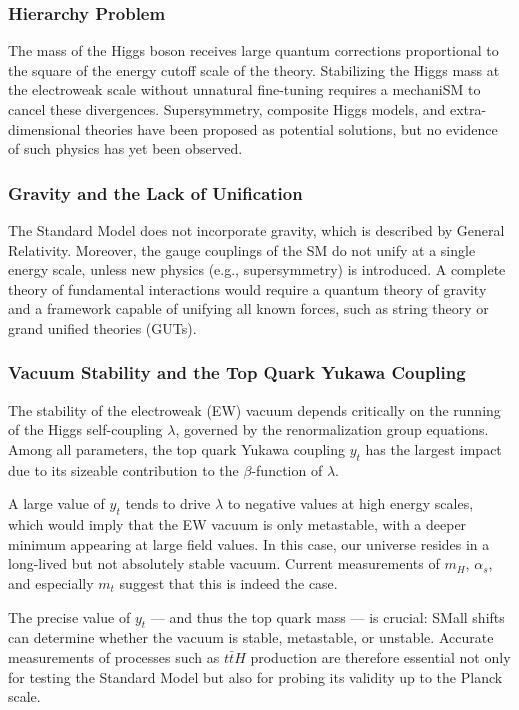 \documentclass[11pt,twoside]{book}
\begin{document}
\subsubsection*{Hierarchy Problem}

The mass of the Higgs boson receives large quantum corrections proportional to the square of the energy cutoff scale of the theory. Stabilizing the Higgs mass at the electroweak scale without unnatural fine-tuning requires a mechani\acrshort{SM} to cancel these divergences. Supersymmetry, composite Higgs models, and extra-dimensional theories have been proposed as potential solutions, but no evidence of such physics has yet been observed.

\subsubsection*{Gravity and the Lack of Unification}

The Standard Model does not incorporate gravity, which is described by General Relativity. Moreover, the gauge couplings of the \acrshort{SM} do not unify at a single energy scale, unless new physics (e.g., supersymmetry) is introduced. A complete theory of fundamental interactions would require a quantum theory of gravity and a framework capable of unifying all known forces, such as string theory or grand unified theories (GUTs).

\subsubsection*{Vacuum Stability and the Top Quark Yukawa Coupling}
The stability of the electroweak (EW) vacuum depends critically on the running of the Higgs self-coupling $\lambda$, governed by the renormalization group equations. Among all parameters, the top quark Yukawa coupling $y_t$ has the largest impact due to its sizeable contribution to the $\beta$-function of $\lambda$.

A large value of $y_t$ tends to drive $\lambda$ to negative values at high energy scales, which would imply that the EW vacuum is only metastable, with a deeper minimum appearing at large field values. In this case, our universe resides in a long-lived but not absolutely stable vacuum. Current measurements of $m_H$, $\alpha_s$, and especially $m_t$ suggest that this is indeed the case.

The precise value of $y_t$ — and thus the top quark mass — is crucial: \acrshort{SM}all shifts can determine whether the vacuum is stable, metastable, or unstable. Accurate measurements of processes such as $t\bar{t}H$ production are therefore essential not only for testing the Standard Model but also for probing its validity up to the Planck scale.
\end{document}

